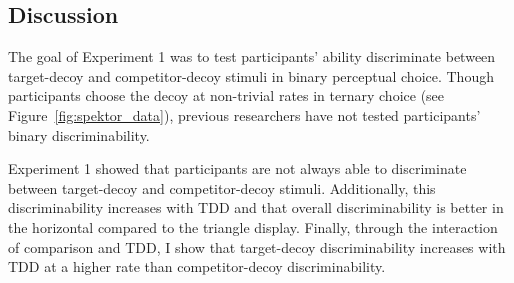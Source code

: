 \subsection{Discussion}

The goal of Experiment 1 was to test participants' ability discriminate between target-decoy and competitor-decoy stimuli in binary perceptual choice. Though participants choose the decoy at non-trivial rates in ternary choice (see Figure~\ref{fig:spektor_data}), previous researchers have not tested participants' binary discriminability. 

Experiment 1 showed that participants are not always able to discriminate between target-decoy and competitor-decoy stimuli. Additionally, this discriminability increases with TDD and that overall discriminability is better in the horizontal compared to the triangle display. Finally, through the interaction of comparison and TDD, I show that target-decoy discriminability increases with TDD at a higher rate than competitor-decoy discriminability. 





